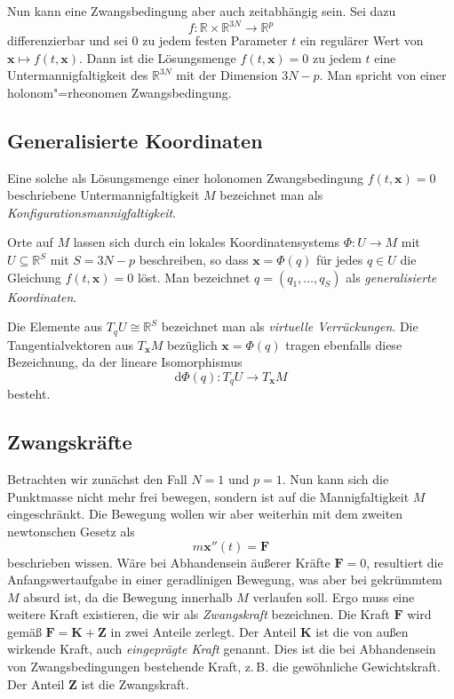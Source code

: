 \documentclass[a4paper,10pt,fleqn,twocolumn,twoside,dvipdfmx]{scrartcl}
\numberwithin{equation}{section}
\newcommand{\bv}[1]{\mathbf{#1}}
\newcommand{\R}{\mathbb R}
\begin{document}
Nun kann eine Zwangsbedingung aber auch zeitabhängig sein. Sei dazu
\[f\colon\R\times\R^{3N}\to\R^p\]
differenzierbar und sei $0$ zu jedem festen Parameter $t$ ein
regulärer Wert von $\bv x\mapsto f(t,\bv x)$. Dann ist die
Lösungsmenge $f(t,\bv x)=0$ zu jedem $t$ eine Untermannigfaltigkeit
des $\R^{3N}$ mit der Dimension $3N-p$. Man spricht von einer
holonom"=rheonomen Zwangsbedingung.

\subsection{Generalisierte Koordinaten}

Eine solche als Lösungsmenge einer holonomen Zwangsbedingung $f(t,\bv x)=0$
beschriebene Untermannigfaltigkeit $M$ bezeichnet man als
\emph{Konfigurationsmannigfaltigkeit}.

Orte auf $M$ lassen sich durch ein lokales Koordinatensystems
$\Phi\colon U\to M$ mit $U\subseteq\R^S$ mit $S=3N-p$ beschreiben, so
dass $\bv x = \Phi(q)$ für jedes $q\in U$ die Gleichung $f(t,\bv x)=0$
löst. Man bezeichnet $q=(q_1,\ldots,q_S)$ als \emph{generalisierte Koordinaten}.

Die Elemente aus $T_q U\cong\R^S$ bezeichnet man als
\emph{virtuelle Verrückungen}. Die Tangentialvektoren aus
$T_{\bv x} M$ bezüglich $\bv x = \Phi(q)$ tragen ebenfalls diese
Bezeichnung, da der lineare Isomorphismus%
\[\mathrm d\Phi(q)\colon T_q U\to T_{\bv x} M\]
besteht.

\subsection{Zwangskräfte}

Betrachten wir zunächst den Fall $N=1$ und $p=1$. Nun kann sich die
Punktmasse nicht mehr frei bewegen, sondern ist auf die
Mannigfaltigkeit $M$ eingeschränkt. Die Bewegung wollen wir aber
weiterhin mit dem zweiten newtonschen Gesetz als
\[m\bv x''(t) = \bv F\]
beschrieben wissen. Wäre bei Abhandensein äußerer Kräfte $\bv F=0$,
resultiert die Anfangswertaufgabe in einer geradlinigen Bewegung, was
aber bei gekrümmtem $M$ absurd ist, da die Bewegung innerhalb $M$
verlaufen soll. Ergo muss eine weitere Kraft
existieren, die wir als \emph{Zwangskraft} bezeichnen. Die Kraft
$\bv F$ wird gemäß $\bv F = \bv K+\bv Z$ in zwei Anteile zerlegt.
Der Anteil $\bv K$ ist die von außen wirkende Kraft, auch
\emph{eingeprägte Kraft} genannt. Dies ist die bei Abhandensein
von Zwangsbedingungen bestehende Kraft, z.\,B. die gewöhnliche
Gewichtskraft. Der Anteil $\bv Z$ ist die Zwangskraft.
\end{document}

